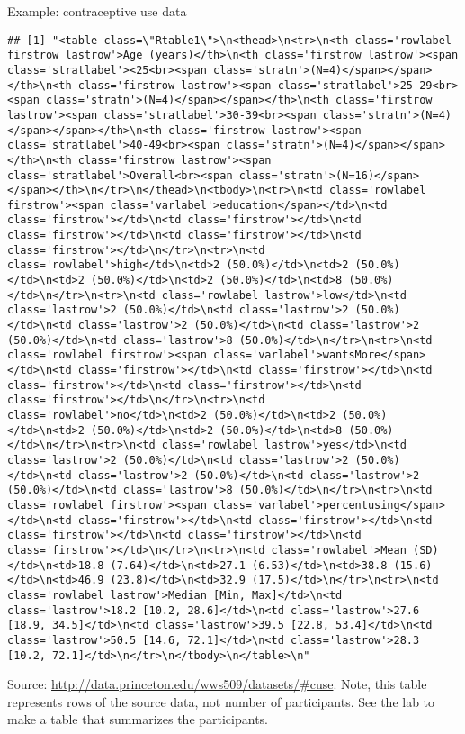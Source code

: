 \documentclass[
  ignorenonframetext,
]{beamer}
\begin{document}
\begin{frame}[fragile]{Example: contraceptive use data}
\protect\hypertarget{example-contraceptive-use-data}{}

\tiny

\begin{verbatim}
## [1] "<table class=\"Rtable1\">\n<thead>\n<tr>\n<th class='rowlabel firstrow lastrow'>Age (years)</th>\n<th class='firstrow lastrow'><span class='stratlabel'><25<br><span class='stratn'>(N=4)</span></span></th>\n<th class='firstrow lastrow'><span class='stratlabel'>25-29<br><span class='stratn'>(N=4)</span></span></th>\n<th class='firstrow lastrow'><span class='stratlabel'>30-39<br><span class='stratn'>(N=4)</span></span></th>\n<th class='firstrow lastrow'><span class='stratlabel'>40-49<br><span class='stratn'>(N=4)</span></span></th>\n<th class='firstrow lastrow'><span class='stratlabel'>Overall<br><span class='stratn'>(N=16)</span></span></th>\n</tr>\n</thead>\n<tbody>\n<tr>\n<td class='rowlabel firstrow'><span class='varlabel'>education</span></td>\n<td class='firstrow'></td>\n<td class='firstrow'></td>\n<td class='firstrow'></td>\n<td class='firstrow'></td>\n<td class='firstrow'></td>\n</tr>\n<tr>\n<td class='rowlabel'>high</td>\n<td>2 (50.0%)</td>\n<td>2 (50.0%)</td>\n<td>2 (50.0%)</td>\n<td>2 (50.0%)</td>\n<td>8 (50.0%)</td>\n</tr>\n<tr>\n<td class='rowlabel lastrow'>low</td>\n<td class='lastrow'>2 (50.0%)</td>\n<td class='lastrow'>2 (50.0%)</td>\n<td class='lastrow'>2 (50.0%)</td>\n<td class='lastrow'>2 (50.0%)</td>\n<td class='lastrow'>8 (50.0%)</td>\n</tr>\n<tr>\n<td class='rowlabel firstrow'><span class='varlabel'>wantsMore</span></td>\n<td class='firstrow'></td>\n<td class='firstrow'></td>\n<td class='firstrow'></td>\n<td class='firstrow'></td>\n<td class='firstrow'></td>\n</tr>\n<tr>\n<td class='rowlabel'>no</td>\n<td>2 (50.0%)</td>\n<td>2 (50.0%)</td>\n<td>2 (50.0%)</td>\n<td>2 (50.0%)</td>\n<td>8 (50.0%)</td>\n</tr>\n<tr>\n<td class='rowlabel lastrow'>yes</td>\n<td class='lastrow'>2 (50.0%)</td>\n<td class='lastrow'>2 (50.0%)</td>\n<td class='lastrow'>2 (50.0%)</td>\n<td class='lastrow'>2 (50.0%)</td>\n<td class='lastrow'>8 (50.0%)</td>\n</tr>\n<tr>\n<td class='rowlabel firstrow'><span class='varlabel'>percentusing</span></td>\n<td class='firstrow'></td>\n<td class='firstrow'></td>\n<td class='firstrow'></td>\n<td class='firstrow'></td>\n<td class='firstrow'></td>\n</tr>\n<tr>\n<td class='rowlabel'>Mean (SD)</td>\n<td>18.8 (7.64)</td>\n<td>27.1 (6.53)</td>\n<td>38.8 (15.6)</td>\n<td>46.9 (23.8)</td>\n<td>32.9 (17.5)</td>\n</tr>\n<tr>\n<td class='rowlabel lastrow'>Median [Min, Max]</td>\n<td class='lastrow'>18.2 [10.2, 28.6]</td>\n<td class='lastrow'>27.6 [18.9, 34.5]</td>\n<td class='lastrow'>39.5 [22.8, 53.4]</td>\n<td class='lastrow'>50.5 [14.6, 72.1]</td>\n<td class='lastrow'>28.3 [10.2, 72.1]</td>\n</tr>\n</tbody>\n</table>\n"
\end{verbatim}

Source: \url{http://data.princeton.edu/wws509/datasets/\#cuse}. Note,
this table represents rows of the source data, not number of
participants. See the lab to make a table that summarizes the
participants.

\end{frame}
\end{document}
